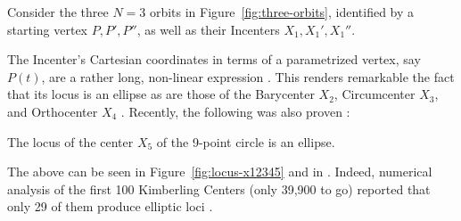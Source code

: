 Consider the three $N=3$ orbits in Figure~\ref{fig:three-orbits}, identified by a starting vertex $P,P',P''$, as well as their Incenters $X_1,X_1',X_1''$.

The Incenter's Cartesian coordinates in terms of a parametrized vertex, say $P(t)$, are a rather long, non-linear expression \cite{ronaldo19}. This renders remarkable the fact that its locus is an ellipse \cite{olga14} as are those of the Barycenter $X_2$, Circumcenter $X_3$, and Orthocenter $X_4$ \cite{corentin19,ronaldo19,sergei2016}. Recently, the following was also proven \cite{ronaldo19a}:

\begin{theorem}
The locus of the center $X_5$ of the 9-point circle is an ellipse.
\end{theorem}

The above can be seen in Figure~\ref{fig:locus-x12345} and in \cite[pl\#7]{dsr_math_intell_playlist}. Indeed, numerical analysis of the first 100 Kimberling Centers (only 39,900 to go) reported that only 29 of them produce elliptic loci \cite{ronaldo19a}.

